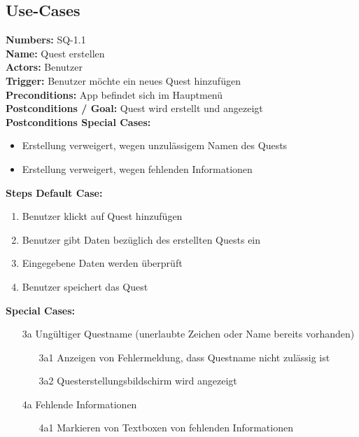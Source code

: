 \documentclass{article}
\begin{document}
\subsection{Use-Cases}


\textbf{Numbers:} SQ-1.1\\
\textbf{Name:} Quest erstellen\\
\textbf{Actors:} Benutzer\\
\textbf{Trigger:} Benutzer möchte ein neues Quest hinzufügen\\
\textbf{Preconditions:}  App befindet sich im Hauptmenü\\
\textbf{Postconditions / Goal:} Quest wird erstellt und angezeigt\\
\textbf{Postconditions Special Cases:}
\begin{itemize}
    \item Erstellung verweigert, wegen unzulässigem Namen des Quests
    \item Erstellung verweigert, wegen fehlenden Informationen
\end{itemize}
\textbf{Steps Default Case:} 
\begin{enumerate}
    \item Benutzer klickt auf Quest hinzufügen
    \item Benutzer gibt Daten bezüglich des erstellten Quests ein 
    \item Eingegebene Daten werden überprüft 
    \item Benutzer speichert das Quest
\end{enumerate}
\textbf{Special Cases:}
\begin{itemize}
    \item [3a] Ungültiger Questname (unerlaubte Zeichen oder Name bereits vorhanden)
    \begin{itemize}
        \item [3a1] Anzeigen von Fehlermeldung, dass Questname nicht zulässig ist
        \item [3a2] Questerstellungsbildschirm wird angezeigt
    \end{itemize}
    \item [4a] Fehlende Informationen
    \begin{itemize}
        \item [4a1] Markieren von Textboxen von fehlenden Informationen
    \end{itemize}
\end{itemize}
\end{document}
